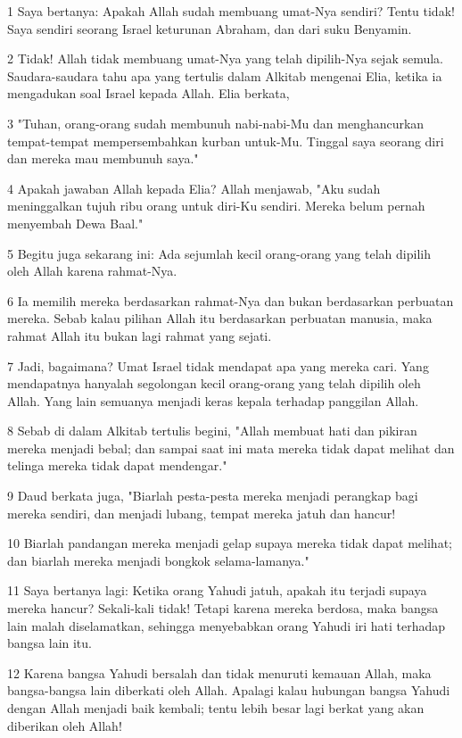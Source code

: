 \par 1 Saya bertanya: Apakah Allah sudah membuang umat-Nya sendiri? Tentu tidak! Saya sendiri seorang Israel keturunan Abraham, dan dari suku Benyamin.
\par 2 Tidak! Allah tidak membuang umat-Nya yang telah dipilih-Nya sejak semula. Saudara-saudara tahu apa yang tertulis dalam Alkitab mengenai Elia, ketika ia mengadukan soal Israel kepada Allah. Elia berkata,
\par 3 "Tuhan, orang-orang sudah membunuh nabi-nabi-Mu dan menghancurkan tempat-tempat mempersembahkan kurban untuk-Mu. Tinggal saya seorang diri dan mereka mau membunuh saya."
\par 4 Apakah jawaban Allah kepada Elia? Allah menjawab, "Aku sudah meninggalkan tujuh ribu orang untuk diri-Ku sendiri. Mereka belum pernah menyembah Dewa Baal."
\par 5 Begitu juga sekarang ini: Ada sejumlah kecil orang-orang yang telah dipilih oleh Allah karena rahmat-Nya.
\par 6 Ia memilih mereka berdasarkan rahmat-Nya dan bukan berdasarkan perbuatan mereka. Sebab kalau pilihan Allah itu berdasarkan perbuatan manusia, maka rahmat Allah itu bukan lagi rahmat yang sejati.
\par 7 Jadi, bagaimana? Umat Israel tidak mendapat apa yang mereka cari. Yang mendapatnya hanyalah segolongan kecil orang-orang yang telah dipilih oleh Allah. Yang lain semuanya menjadi keras kepala terhadap panggilan Allah.
\par 8 Sebab di dalam Alkitab tertulis begini, "Allah membuat hati dan pikiran mereka menjadi bebal; dan sampai saat ini mata mereka tidak dapat melihat dan telinga mereka tidak dapat mendengar."
\par 9 Daud berkata juga, "Biarlah pesta-pesta mereka menjadi perangkap bagi mereka sendiri, dan menjadi lubang, tempat mereka jatuh dan hancur!
\par 10 Biarlah pandangan mereka menjadi gelap supaya mereka tidak dapat melihat; dan biarlah mereka menjadi bongkok selama-lamanya."
\par 11 Saya bertanya lagi: Ketika orang Yahudi jatuh, apakah itu terjadi supaya mereka hancur? Sekali-kali tidak! Tetapi karena mereka berdosa, maka bangsa lain malah diselamatkan, sehingga menyebabkan orang Yahudi iri hati terhadap bangsa lain itu.
\par 12 Karena bangsa Yahudi bersalah dan tidak menuruti kemauan Allah, maka bangsa-bangsa lain diberkati oleh Allah. Apalagi kalau hubungan bangsa Yahudi dengan Allah menjadi baik kembali; tentu lebih besar lagi berkat yang akan diberikan oleh Allah!
